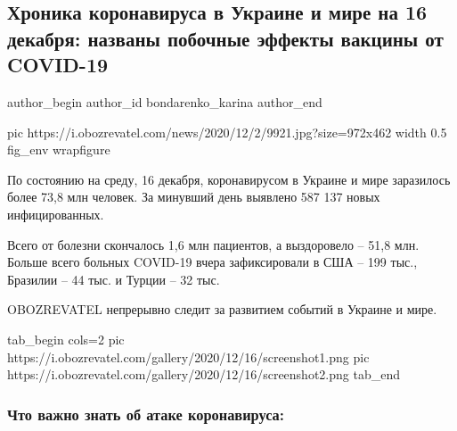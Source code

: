  
 
 
 
 
 
\subsection{Хроника коронавируса в Украине и мире на 16 декабря: названы побочные эффекты вакцины от COVID-19}
\label{sec:16_12_2020.news.ua.obozrevatel.bondarenko_karina.1.covid_vaccine}
\ifcmt
	author_begin
   author_id bondarenko_karina
	author_end
\fi

\ifcmt
  pic https://i.obozrevatel.com/news/2020/12/2/9921.jpg?size=972x462
  width 0.5
  fig_env wrapfigure
\fi

По состоянию на среду, 16 декабря, коронавирусом в Украине и мире заразилось
более 73,8 млн человек. За минувший день выявлено 587 137 новых инфицированных.

Всего от болезни скончалось 1,6 млн пациентов, а выздоровело – 51,8 млн. Больше
всего больных COVID-19 вчера зафиксировали в США – 199 тыс., Бразилии – 44 тыс.
и Турции – 32 тыс.

OBOZREVATEL непрерывно следит за развитием событий в Украине и мире.


\ifcmt
tab_begin cols=2
	pic https://i.obozrevatel.com/gallery/2020/12/16/screenshot1.png
	pic https://i.obozrevatel.com/gallery/2020/12/16/screenshot2.png
tab_end
\fi

\subsubsection{Что важно знать об атаке коронавируса:}

